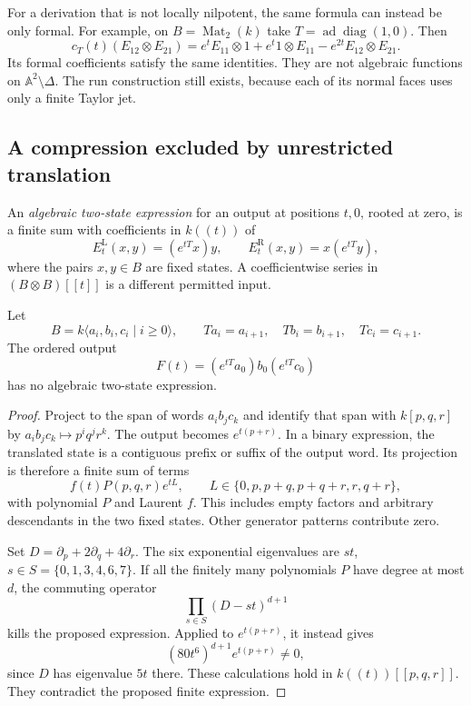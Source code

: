 For a derivation that is not locally nilpotent,
the same formula can instead be only formal.
For example, on \(B=\operatorname{Mat}_2(k)\)
take \(T=\operatorname{ad}\operatorname{diag}(1,0)\).
Then
\[
 c_T(t)(E_{12}\otimes E_{21})
       =e^tE_{11}\otimes1+e^t1\otimes E_{11}
                       -e^{2t}E_{12}\otimes E_{21}.
\]
Its formal coefficients satisfy the same identities.
They are not algebraic functions on
\(\mathbb A^2\setminus\Delta\). The run construction
still exists, because each of its normal faces
uses only a finite Taylor jet.

\subsection{A compression excluded by unrestricted translation}

An \emph{algebraic two-state expression} for an output
at positions \(t,0\), rooted at zero, is a finite sum
with coefficients in \(k((t))\) of
\[
 E_t^{\mathrm L}(x,y)=(e^{tT}x)y,\qquad
 E_t^{\mathrm R}(x,y)=x(e^{tT}y),
\]
where the pairs \(x,y\in B\) are fixed states.
A coefficientwise series in
\((B\otimes B)[[t]]\) is a different permitted input.

\begin{theorem}\label{v4-thm:regular-unrestricted-obstruction}
Let
\[
 B=k\langle a_i,b_i,c_i\mid i\geq0\rangle,\qquad
 Ta_i=a_{i+1},\quad Tb_i=b_{i+1},\quad Tc_i=c_{i+1}.
\]
The ordered output
\[
                      F(t)=(e^{tT}a_0)b_0(e^{tT}c_0)
\]
has no algebraic two-state expression.
\end{theorem}

\begin{proof}
Project to the span of words \(a_i b_j c_k\) and
identify that span with \(k[p,q,r]\) by
\(a_i b_j c_k\mapsto p^iq^jr^k\).
The output becomes \(e^{t(p+r)}\).
In a binary expression, the translated state
is a contiguous prefix or suffix of the output
word. Its projection is therefore a finite sum
of terms
\[
 f(t)P(p,q,r)e^{tL},\qquad
 L\in\{0,p,p+q,p+q+r,r,q+r\},
\]
with polynomial \(P\) and Laurent \(f\).
This includes empty factors and arbitrary
descendants in the two fixed states.
Other generator patterns contribute zero.

Set \(D=\partial_p+2\partial_q+4\partial_r\).
The six exponential eigenvalues are
\(st\), \(s\in S=\{0,1,3,4,6,7\}\).
If all the finitely many polynomials \(P\)
have degree at most \(d\), the commuting operator
\[
                       \prod_{s\in S}(D-st)^{d+1}
\]
kills the proposed expression. Applied to
\(e^{t(p+r)}\), it instead gives
\[
          (80t^6)^{d+1}e^{t(p+r)}\ne0,
\]
since \(D\) has eigenvalue \(5t\) there.
These calculations hold in
\(k((t))[[p,q,r]]\). They contradict the proposed
finite expression.
\end{proof}

